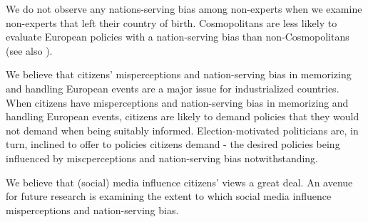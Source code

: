 We do not observe any nations-serving bias among non-experts when we examine non-experts that left their country of birth. Cosmopolitans are less likely to evaluate European policies with a nation-serving bias than non-Cosmopolitans (see also \cite{bechtel}).

We believe that citizens' misperceptions and nation-serving bias in memorizing and handling European events are a major issue for industrialized countries. When citizens have misperceptions and nation-serving bias in memorizing and handling European events, citizens are likely to demand policies that they would not demand when being suitably informed. Election-motivated politicians are, in turn, inclined to offer to policies citizens demand - the desired policies being influenced by miscperceptions and nation-serving bias notwithstanding. 

We believe that (social) media influence citizens' views a great deal. An avenue for future research is examining the extent to which social media influence misperceptions and nation-serving bias. 